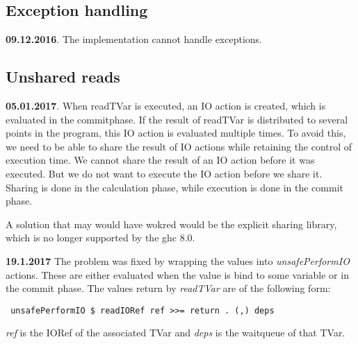 \documentclass[a4paper,10pt]{article}
\begin{document}
\subsection{Exception handling}
\textbf{09.12.2016}. The implementation cannot handle exceptions.


\subsection{Unshared reads}
\textbf{05.01.2017}. When readTVar is executed, an IO action is created, which is evaluated in the commitphase. If the result of 
readTVar is distributed to several points in the program, this IO action is evaluated multiple times. To avoid this, we need to be
able to share the result of IO actions while retaining the control of execution time. We cannot share the result of an IO action
before it was executed. But we do not want to execute the IO action before we share it. Sharing is done in the calculation phase,
while execution is done in the commit phase.

A solution that may would have wokred would be the explicit sharing library, which is no longer supported by the ghc 8.0.

\textbf{19.1.2017}
The problem was fixed by wrapping the values into \textit{unsafePerformIO} actions. These are either evaluated when the 
value is bind to some variable or in the commit phase. The values return by \textit{readTVar} are of the following form:
\begin{lstlisting}
 unsafePerformIO $ readIORef ref >>= return . (,) deps
\end{lstlisting}
\textit{ref} is the IORef of the associated TVar and \textit{deps} is the waitqueue of that TVar.



\end{document}
